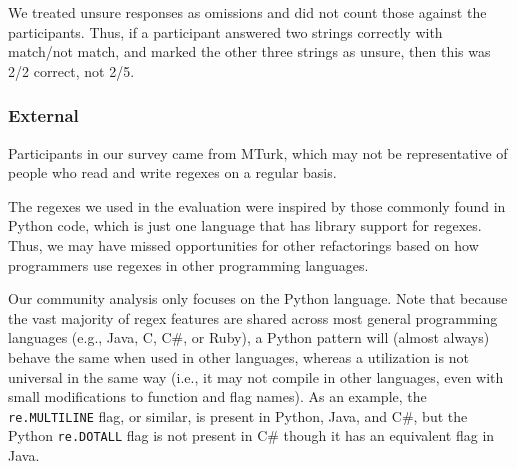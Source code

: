 We treated unsure responses as omissions and did not count those against the participants. Thus, if a participant answered two strings correctly with match/not match, and marked the other three strings as unsure, then this was 2/2 correct, not 2/5.

\subsubsection{External}
Participants in our survey came from MTurk, which may not be representative of people who read and write regexes on a regular basis.

The regexes we used in the evaluation were inspired by those commonly found in Python code, which is just one language that has library support for regexes. Thus, we may have missed opportunities for other refactorings based on how programmers use regexes in other programming languages.

Our community analysis only focuses on the Python language. Note that because the vast majority of regex features are shared across most general programming languages (e.g., Java, C, C\#, or Ruby), a Python {pattern} will (almost always) behave the same when used in other languages, whereas a utilization is not universal in the same way (i.e., it may not compile in other languages, even with small modifications to function and flag names).
As an example, the {\tt re.MULTILINE} flag, or similar, is present in Python, Java, and C\#, but  the Python {\tt re.DOTALL} flag is not present in C\# though it has an equivalent flag in Java.

